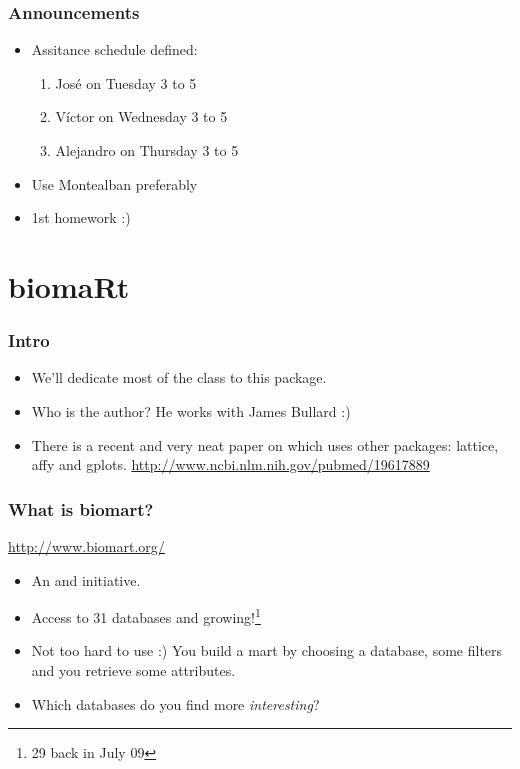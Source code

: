 \begin{frame}[allowframebreaks]
  \frametitle{Announcements}
  \begin{itemize}
  \item Assitance schedule defined:
  \begin{enumerate}
  \item Jos\'e on Tuesday 3 to 5
  \item V\'ictor on Wednesday 3 to 5
  \item Alejandro on Thursday 3 to 5
  \end{enumerate}
  \item Use Montealban preferably
  \item 1st homework :)
  \end{itemize}
\end{frame}


\section{biomaRt}

\begin{frame}[allowframebreaks]
  \frametitle{Intro}
  \begin{itemize}
  \item We'll dedicate most of the class to this package.
  \item Who is the author? He works with James Bullard :)
  \item There is a recent and very neat paper on  which uses other packages: \alert{lattice}, \alert{affy} and \alert{gplots}.
  \url{http://www.ncbi.nlm.nih.gov/pubmed/19617889}
  \end{itemize}
\end{frame}

\begin{frame}[allowframebreaks]
  \frametitle{What is biomart?}
  \url{http://www.biomart.org/}
  \begin{itemize}
  \item An  and  initiative.
  \item Access to 31 databases and \alert{growing}!\footnote{29 back in July 09}
  \item Not too hard to use :) You build a mart by choosing a database, some filters and you retrieve some attributes.
  \item Which databases do you find more \emph{interesting}?
  \end{itemize}
\end{frame}

